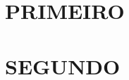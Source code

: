 \begin{appendices}

\renewcommand{\appendixname}{ANEXO}

\setcounter{chapter}{0}

\titleformat{\chapter}{\normalfont\normalsize\bfseries}{\chaptertitlename{} \thechapter\space--}{.5em}{\MakeUppercase}

\chapter{PRIMEIRO} \label{ann:annexa}

\pagebreak

\chapter{SEGUNDO} \label{ann:annexb}

\pagebreak
\end{appendices}

\printindex
\thispagestyle{myheadings} %
